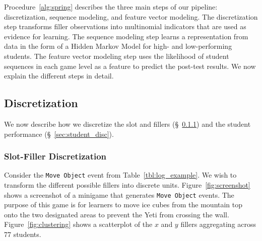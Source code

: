 \documentclass{sigchi}
\begin{document}
	Procedure~\ref{alg:spring} describes the three main steps of our pipeline: discretization,  sequence modeling, and feature vector modeling.
	The discretization step transforms  filler observations into multinomial indicators that are used as evidence for learning.
	The sequence modeling step learns a representation from data in the form of a Hidden Markov Model for high- and low-performing students.
	The feature vector modeling step uses the likelihood of student sequences in each game level as a feature to predict the post-test results.
	We now explain the different steps in detail.

	
	\subsection{Discretization}
	We now describe how we discretize
	the slot and fillers (\S~\ref{sec:filler_disc}) 
	and the student performance (\S~\ref{sec:student_disc}).
	
	\subsubsection{Slot-Filler Discretization}
	\label{sec:filler_disc}
	
	Consider the \texttt{Move Object} event from Table~\ref{tbl:log_example}.
	We wish to transform the different possible fillers into discrete units.
	Figure~\ref{fig:screenshot} shows a screenshot of a minigame that generates  \texttt{Move Object} events.
	The purpose of this game is for learners to move ice cubes from the mountain top onto the two designated areas to prevent the Yeti from crossing the wall.
	Figure~\ref{fig:clustering} shows a scatterplot of the $x$ and $y$ fillers aggregating across 77 students.
	
\end{document}
